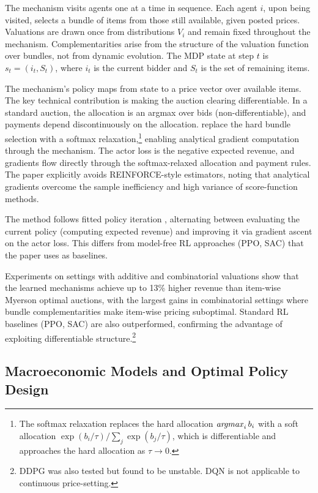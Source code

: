 The mechanism visits agents one at a time in sequence. Each agent $i$, upon being visited, selects a bundle of items from those still available, given posted prices. Valuations are drawn once from distributions $V_i$ and remain fixed throughout the mechanism. Complementarities arise from the structure of the valuation function over bundles, not from dynamic evolution. The MDP state at step $t$ is $s_t = (i_t, S_t)$, where $i_t$ is the current bidder and $S_t$ is the set of remaining items.

The mechanism's policy maps from state to a price vector over available items. The key technical contribution is making the auction clearing differentiable. In a standard auction, the allocation is an argmax over bids (non-differentiable), and payments depend discontinuously on the allocation. \citet{RavindranathEtAl2024} replace the hard bundle selection with a softmax relaxation,\footnote{The softmax relaxation replaces the hard allocation $\mathop{\it argmax}_i b_i$ with a soft allocation $\exp(b_i/\tau)/\sum_j \exp(b_j/\tau)$, which is differentiable and approaches the hard allocation as $\tau \to 0$.} enabling analytical gradient computation through the mechanism. The actor loss is the negative expected revenue, and gradients flow directly through the softmax-relaxed allocation and payment rules. The paper explicitly avoids REINFORCE-style estimators, noting that analytical gradients overcome the sample inefficiency and high variance of score-function methods.

The method follows fitted policy iteration \citep{bertsekastsitsiklis1996}, alternating between evaluating the current policy (computing expected revenue) and improving it via gradient ascent on the actor loss. This differs from model-free RL approaches (PPO, SAC) that the paper uses as baselines.

Experiments on settings with additive and combinatorial valuations show that the learned mechanisms achieve up to 13\% higher revenue than item-wise Myerson optimal auctions, with the largest gains in combinatorial settings where bundle complementarities make item-wise pricing suboptimal. Standard RL baselines (PPO, SAC) are also outperformed, confirming the advantage of exploiting differentiable structure.\footnote{DDPG was also tested but found to be unstable. DQN is not applicable to continuous price-setting.}


\subsection{Macroeconomic Models and Optimal Policy Design}

